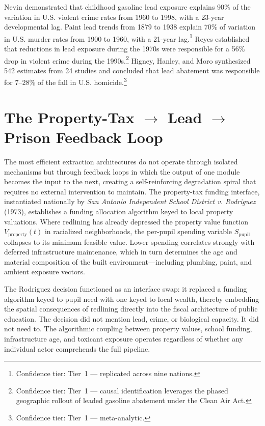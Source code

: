 Nevin demonstrated that childhood gasoline lead exposure explains 90\% of the
variation in U.S. violent crime rates from 1960 to 1998, with a 23-year
developmental lag. Paint lead trends from
1879 to 1938 explain 70\% of variation in U.S. murder rates from 1900 to 1960,
with a 21-year lag.\footnote{Confidence tier: Tier~1 --- replicated across nine
nations.} Reyes established that reductions in lead exposure during the 1970s
were responsible for a 56\% drop in violent crime during the
1990s.\footnote{Confidence tier: Tier~1 --- causal
identification leverages the phased geographic rollout of leaded gasoline
abatement under the Clean Air Act.} Higney, Hanley, and Moro synthesized 542
estimates from 24 studies and concluded that lead abatement was responsible for
7--28\% of the fall in U.S. homicide.\footnote{Confidence tier: Tier~1 --- meta-analytic.}

\section{The Property-Tax $\rightarrow$ Lead $\rightarrow$ Prison Feedback Loop}

The most efficient extraction architectures do not operate through isolated
mechanisms but through feedback loops in which the output of one module becomes
the input to the next, creating a self-reinforcing degradation spiral that
requires no external intervention to maintain. The property-tax funding
interface, instantiated nationally by \textit{San Antonio Independent School
District v. Rodriguez} (1973), establishes a funding allocation algorithm keyed
to local property valuations. Where redlining has already depressed the property
value function $V_{\text{property}}(t)$ in racialized neighborhoods, the
per-pupil spending variable $S_{\text{pupil}}$ collapses to its minimum feasible
value. Lower spending correlates strongly with deferred infrastructure
maintenance, which in turn determines the age and material composition of the
built environment---including plumbing, paint, and ambient exposure vectors.

The Rodriguez decision functioned as an interface swap: it replaced a funding
algorithm keyed to pupil need with one keyed to local wealth, thereby embedding
the spatial consequences of redlining directly into the fiscal architecture of
public education. The decision did not mention lead, crime, or biological
capacity. It did not need to. The algorithmic coupling between property values,
school funding, infrastructure age, and toxicant exposure operates regardless of
whether any individual actor comprehends the full pipeline.

